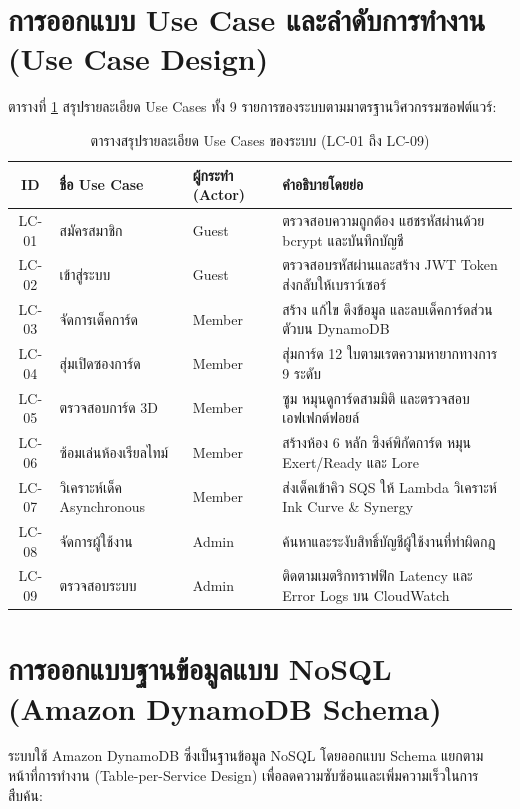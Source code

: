\documentclass[12pt,a4paper]{report}
\begin{document}
\section{การออกแบบ Use Case และลำดับการทำงาน (Use Case Design)}
ตารางที่ \ref{tab:usecases} สรุปรายละเอียด Use Cases ทั้ง 9 รายการของระบบตามมาตรฐานวิศวกรรมซอฟต์แวร์:

\begin{table}[H]
\centering
\caption{ตารางสรุปรายละเอียด Use Cases ของระบบ (LC-01 ถึง LC-09)}
\label{tab:usecases}
\small
\begin{tabularx}{\textwidth}{cllX}
\toprule
\textbf{ID} & \textbf{ชื่อ Use Case} & \textbf{ผู้กระทำ (Actor)} & \textbf{คำอธิบายโดยย่อ} \\
\midrule
LC-01 & สมัครสมาชิก & Guest & ตรวจสอบความถูกต้อง แฮชรหัสผ่านด้วย bcrypt และบันทึกบัญชี \\
LC-02 & เข้าสู่ระบบ & Guest & ตรวจสอบรหัสผ่านและสร้าง JWT Token ส่งกลับให้เบราว์เซอร์ \\
LC-03 & จัดการเด็คการ์ด & Member & สร้าง แก้ไข ดึงข้อมูล และลบเด็คการ์ดส่วนตัวบน DynamoDB \\
LC-04 & สุ่มเปิดซองการ์ด & Member & สุ่มการ์ด 12 ใบตามเรตความหายากทางการ 9 ระดับ \\
LC-05 & ตรวจสอบการ์ด 3D & Member & ซูม หมุนดูการ์ดสามมิติ และตรวจสอบเอฟเฟกต์ฟอยล์ \\
LC-06 & ซ้อมเล่นห้องเรียลไทม์ & Member & สร้างห้อง 6 หลัก ซิงค์พิกัดการ์ด หมุน Exert/Ready และ Lore \\
LC-07 & วิเคราะห์เด็ค Asynchronous & Member & ส่งเด็คเข้าคิว SQS ให้ Lambda วิเคราะห์ Ink Curve \& Synergy \\
LC-08 & จัดการผู้ใช้งาน & Admin & ค้นหาและระงับสิทธิ์บัญชีผู้ใช้งานที่ทำผิดกฎ \\
LC-09 & ตรวจสอบระบบ & Admin & ติดตามเมตริกทราฟฟิก Latency และ Error Logs บน CloudWatch \\
\bottomrule
\end{tabularx}
\end{table}

\section{การออกแบบฐานข้อมูลแบบ NoSQL (Amazon DynamoDB Schema)}
ระบบใช้ Amazon DynamoDB ซึ่งเป็นฐานข้อมูล NoSQL โดยออกแบบ Schema แยกตามหน้าที่การทำงาน (Table-per-Service Design) เพื่อลดความซับซ้อนและเพิ่มความเร็วในการสืบค้น:
\end{document}

